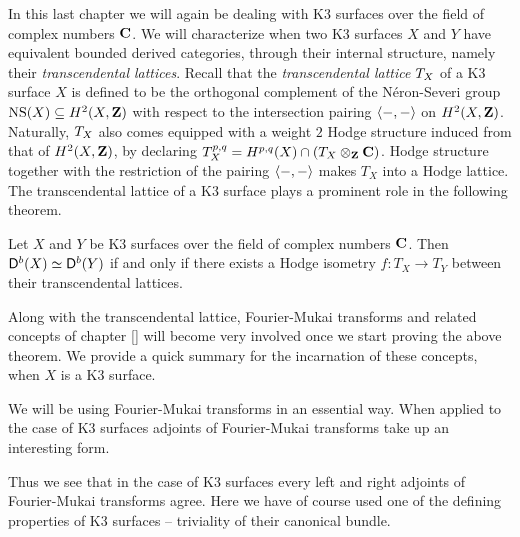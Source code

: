 \newpage


In this last chapter we will again be dealing with K3 surfaces over the field of complex numbers $\mathbf C$. We will characterize when two K3 surfaces $X$ and $Y$ have equivalent bounded derived categories, through their internal structure, namely their \emph{transcendental lattices}. Recall that the \emph{transcendental lattice} $T_{X}$ of a K3 surface $X$ is defined to be the orthogonal complement of the Néron-Severi group $\operatorname{NS}(X) \subseteq H^{2}(X, \mathbf Z)$ with respect to the intersection pairing $\langle -, - \rangle$ on $H^{2}(X, \mathbf Z)$.
Naturally, $T_{X}$ also comes equipped with a weight $2$ Hodge structure induced from that of $H^{2}(X, \mathbf Z)$, by declaring $T_{X}^{p,q} = H^{p,q}(X) \cap (T_{X} \otimes_\mathbf Z \mathbf C)$. Hodge structure together with the restriction of the pairing $\langle -, - \rangle$ makes $T_X$ into a Hodge lattice. The transcendental lattice of a K3 surface plays a prominent role in the following theorem. 


\begin{theorem}
    \label{Derived Torelli}
    Let $X$ and $Y$ be K3 surfaces over the field of complex numbers $\mathbf C$. Then $\mathsf{D}^b(X) \simeq \mathsf{D}^b(Y)$ if and only if there exists a Hodge isometry $f\colon T_X \to T_Y$ between their transcendental lattices.
\end{theorem}

Along with the transcendental lattice, Fourier-Mukai transforms and related concepts of chapter \ref{} will become very involved once we start proving the above theorem. We provide a quick summary for the incarnation of these concepts, when $X$ is a K3 surface. 



We will be using Fourier-Mukai transforms in an essential way. When applied to the case of K3 surfaces adjoints of Fourier-Mukai transforms take up an interesting form.

Thus we see that in the case of K3 surfaces every left and right adjoints of Fourier-Mukai transforms agree.
Here we have of course used one of the defining properties of K3 surfaces -- triviality of their canonical bundle.


